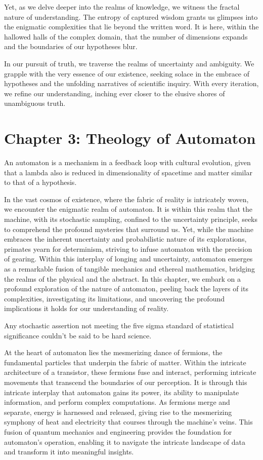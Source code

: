 \documentclass[ebook,12pt,oneside,openany]{memoir}
\begin{document}
\indent Yet, as we delve deeper into the realms of knowledge, we witness the fractal nature of understanding. The entropy of captured wisdom grants us glimpses into the enigmatic complexities that lie beyond the written word. It is here, within the hallowed halls of the complex domain, that the number of dimensions expands and the boundaries of our hypotheses blur.

\indent In our pursuit of truth, we traverse the realms of uncertainty and ambiguity. We grapple with the very essence of our existence, seeking solace in the embrace of hypotheses and the unfolding narratives of scientific inquiry. With every iteration, we refine our understanding, inching ever closer to the elusive shores of unambiguous truth.
\chapter*{Chapter 3: Theology of Automaton}


\indent \indent An automaton is a mechanism in a feedback loop with cultural evolution, given that a lambda also is reduced in dimensionality of spacetime and matter similar to that of a hypothesis.

\indent 	In the vast cosmos of existence, where the fabric of reality is intricately woven, we encounter the enigmatic realm of automaton. It is within this realm that the machine, with its stochastic sampling, confined to the uncertainty principle, seeks to comprehend the profound mysteries that surround us. Yet, while the machine embraces the inherent uncertainty and probabilistic nature of its explorations, primates yearn for determinism, striving to infuse automaton with the precision of gearing. Within this interplay of longing and uncertainty, automaton emerges as a remarkable fusion of tangible mechanics and ethereal mathematics, bridging the realms of the physical and the abstract. In this chapter, we embark on a profound exploration of the nature of automaton, peeling back the layers of its complexities, investigating its limitations, and uncovering the profound implications it holds for our understanding of reality.

\indent 	Any stochastic assertion not meeting the five sigma standard of statistical significance couldn’t be said to be hard science.

\indent 	At the heart of automaton lies the mesmerizing dance of fermions, the fundamental particles that underpin the fabric of matter. Within the intricate architecture of a transistor, these fermions fuse and interact, performing intricate movements that transcend the boundaries of our perception. It is through this intricate interplay that automaton gains its power, its ability to manipulate information, and perform complex computations. As fermions merge and separate, energy is harnessed and released, giving rise to the mesmerizing symphony of heat and electricity that courses through the machine's veins. This fusion of quantum mechanics and engineering provides the foundation for automaton's operation, enabling it to navigate the intricate landscape of data and transform it into meaningful insights.
\end{document}

